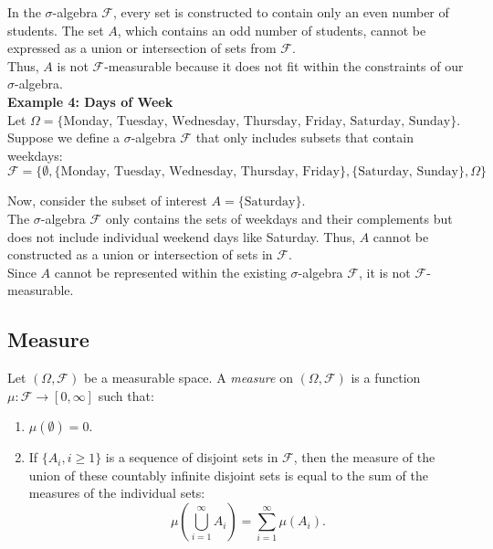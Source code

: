 In the \( \sigma \)-algebra \( \mathcal{F} \), every set is constructed to contain only an even number of students. The set \( A \), which contains an odd number of students, cannot be expressed as a union or intersection of sets from \( \mathcal{F} \).\\

Thus, \( A \) is not \( \mathcal{F} \)-measurable because it does not fit within the constraints of our \( \sigma \)-algebra.\\

\textbf{Example 4: Days of Week}\\

Let \( \Omega = \{\text{Monday, Tuesday, Wednesday, Thursday, Friday, Saturday, Sunday}\} \). \\

Suppose we define a \( \sigma \)-algebra \( \mathcal{F} \) that only includes subsets that contain weekdays:
\[
\mathcal{F} = \{\emptyset, \{\text{Monday, Tuesday, Wednesday, Thursday, Friday}\}, \{\text{Saturday, Sunday}\}, \Omega\}
\]

Now, consider the subset of interest \( A = \{\text{Saturday}\} \).\\

The \( \sigma \)-algebra \( \mathcal{F} \) only contains the sets of weekdays and their complements but does not include individual weekend days like Saturday. Thus, \( A \) cannot be constructed as a union or intersection of sets in \( \mathcal{F} \).\\

Since \( A \) cannot be represented within the existing \( \sigma \)-algebra \( \mathcal{F} \), it is not \( \mathcal{F} \)-measurable.

\subsection{Measure}

\begin{definition}
    Let \((\Omega, \mathcal{F})\) be a measurable space. A \textit{measure} on \((\Omega, \mathcal{F})\) is a function \(\mu: \mathcal{F} \to [0, \infty]\) such that:

\begin{enumerate}
    \item \(\mu(\emptyset) = 0.\)
    \item If \(\{A_i, i \geq 1\}\) is a sequence of disjoint sets in \(\mathcal{F}\), then the measure of the union of these countably infinite disjoint sets is equal to the sum of the measures of the individual sets:
    \[
    \mu\left(\bigcup_{i=1}^{\infty} A_i\right) = \sum_{i=1}^{\infty} \mu(A_i).
    \]
\end{enumerate}
\end{definition}

